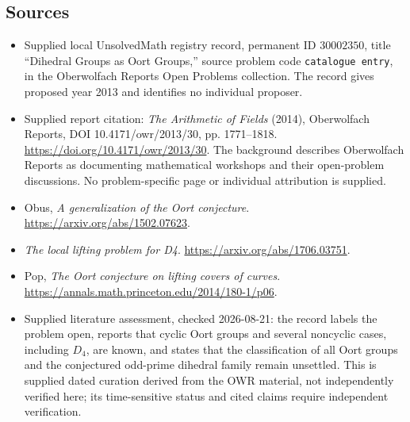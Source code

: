 \documentclass[11pt]{article}
\begin{document}
\subsection{Sources}
\begin{itemize}
\item Supplied local UnsolvedMath registry record, permanent ID \(30002350\), title ``Dihedral Groups as Oort Groups,'' source problem code \texttt{catalogue entry}, in the Oberwolfach Reports Open Problems collection. The record gives proposed year 2013 and identifies no individual proposer.
\item Supplied report citation: \emph{The Arithmetic of Fields} (2014), Oberwolfach Reports, DOI 10.4171/owr/2013/30, pp. 1771--1818. \url{https://doi.org/10.4171/owr/2013/30}. The background describes Oberwolfach Reports as documenting mathematical workshops and their open-problem discussions. No problem-specific page or individual attribution is supplied.
\item Obus, \emph{A generalization of the Oort conjecture}. \url{https://arxiv.org/abs/1502.07623}.
\item \emph{The local lifting problem for D4}. \url{https://arxiv.org/abs/1706.03751}.
\item Pop, \emph{The Oort conjecture on lifting covers of curves}. \url{https://annals.math.princeton.edu/2014/180-1/p06}.
\item Supplied literature assessment, checked 2026-08-21: the record labels the problem open, reports that cyclic Oort groups and several noncyclic cases, including \(D_4\), are known, and states that the classification of all Oort groups and the conjectured odd-prime dihedral family remain unsettled. This is supplied dated curation derived from the OWR material, not independently verified here; its time-sensitive status and cited claims require independent verification.
\end{itemize}
\end{document}
